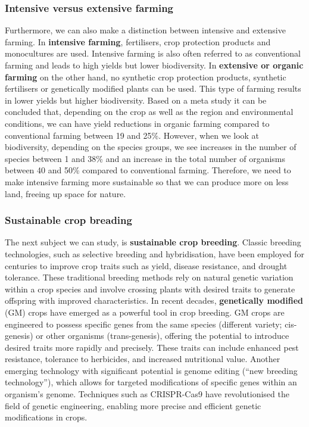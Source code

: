 \documentclass[../summary.tex]{subfiles}
\begin{document}
\subsubsection{Intensive versus extensive farming}

Furthermore, we can also make a distinction between intensive and extensive farming. In \textbf{intensive farming}, fertilisers, crop protection products and monocultures are used. Intensive farming is also often referred to as conventional farming and leads to high yields but lower biodiversity. In \textbf{extensive or organic farming} on the other hand, no synthetic crop protection products, synthetic fertilisers or genetically modified plants can be used. This type of farming results in lower yields but higher biodiversity. Based on a meta study it can be concluded that, depending on the crop as well as the region and environmental conditions, we can have yield reductions in organic farming compared to conventional farming between 19 and 25\%. However, when we look at biodiversity, depending on the species groups, we see increases in the number of species between 1 and 38\% and an increase in the total number of organisms between 40 and 50\% compared to conventional farming. Therefore, we need to make intensive farming more sustainable so that we can produce more on less land, freeing up space for nature.

\newpage
\subsubsection{Sustainable crop breading}

The next subject we can study, is \textbf{sustainable crop breeding}. Classic breeding technologies, such as selective breeding and hybridisation, have been employed for centuries to improve crop traits such as yield, disease resistance, and drought tolerance. These traditional breeding methods rely on natural genetic variation within a crop species and involve crossing plants with desired traits to generate offspring with improved characteristics. In recent decades, \textbf{genetically modified} (GM) crops have emerged as a powerful tool in crop breeding. GM crops are engineered to possess specific genes from the same species (different variety; cis-genesis) or other organisms (trans-genesis), offering the potential to introduce desired traits more rapidly and precisely. These traits can include enhanced pest resistance, tolerance to herbicides, and increased nutritional value. Another emerging technology with significant potential is genome editing (“new breeding technology”), which allows for targeted modifications of specific genes within an organism's genome. Techniques such as CRISPR-Cas9 have revolutionised the field of genetic engineering, enabling more precise and efficient genetic modifications in crops.
\end{document}
